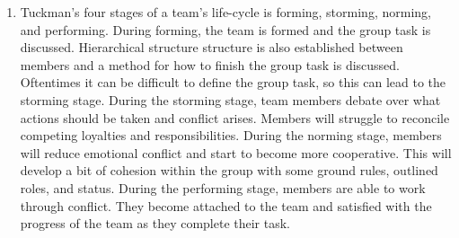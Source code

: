 \documentclass[12pt, letterpaper, titlepage]{article}
\begin{document}
\begin{enumerate}
    \item Tuckman's four stages of a team's life-cycle is forming, storming, norming, and performing. During forming, the team is formed and the group task is discussed. Hierarchical structure structure is also established between members and a method for how to finish the group task is discussed. Oftentimes it  can be difficult to define the group task, so this can lead to the storming stage. During the storming stage, team members debate over what actions should be taken and conflict arises. Members will struggle to reconcile competing loyalties and responsibilities. During the norming stage, members will reduce emotional conflict and start to become more cooperative. This will develop a bit of cohesion within the group with some ground rules, outlined roles, and status. During the performing stage, members are able to work through conflict. They become attached to the team and satisfied with the progress of the team as they complete their task.
\end{enumerate}
\end{document}

